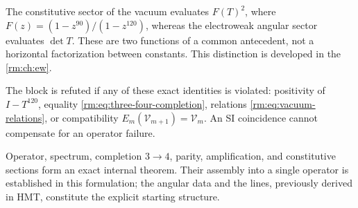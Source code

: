 The constitutive sector of the vacuum evaluates \(F(T)^2\), where
\(F(z)=(1-z^{90})/(1-z^{120})\), whereas the electroweak angular
sector evaluates \(\det T\). These are two functions of a
common antecedent, not a horizontal factorization between constants.
This distinction is developed in the \cref{rm:ch:ew}.

\begin{falsifier}
The block is refuted if any of these exact identities is violated:
positivity of \(I-T^{120}\), equality
\cref{rm:eq:three-four-completion}, relations \cref{rm:eq:vacuum-relations}, or
compatibility \(E_m(\mathcal V_{m+1})=\mathcal V_m\). An SI coincidence
cannot compensate for an operator failure.
\end{falsifier}

\begin{statusbox}
Operator, spectrum, completion \(3\to4\), parity, amplification, and constitutive sections form an exact internal theorem. Their assembly into a single operator is established in this formulation; the angular data and the lines, previously derived in HMT, constitute the explicit starting structure.
\end{statusbox}
